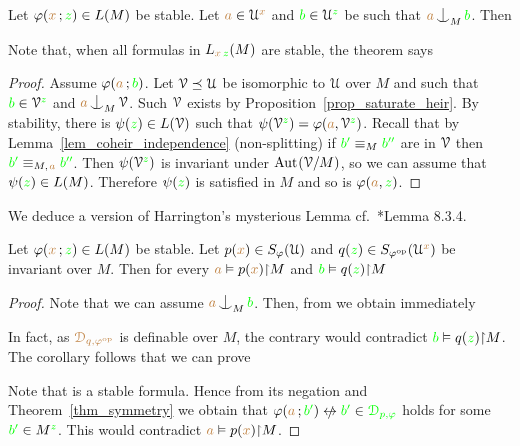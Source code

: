 \begin{theorem}[ (Symmetry)]\label{thm_symmetry}
  Let $\varphi({\color{brown} x}\,;{\color{green} z})\in L(M)$ be stable.
  Let ${\color{brown} a}\in\EuScript U^{\color{brown} x}$ and ${\color{green} b}\in\EuScript U^{\color{green} z}$ be such that ${\mr a}\nonfork_M{\gr b}$.
  Then\smallskip

\end{theorem}

Note that, when all formulas in $L_{{\color{brown} x}\,{\color{green} z}}(M)$ are stable, the theorem says


\vspace*{-\parskip}
\begin{proof}
  Assume $\varphi({\color{brown} a}\,;{\color{green} b})$.
  Let $\EuScript V\preceq\EuScript U$ be isomorphic to $\EuScript U$ over $M$ and such that ${\color{green} b}\in\EuScript V^{\color{green} z}$ and ${\mr a}\nonfork_M\V$. Such $\EuScript V$ exists by Proposition~\ref{prop_saturate_heir}.
  By stability, there is $\psi({\color{green} z})\in L(\EuScript V)$ such that $\psi(\EuScript V^{\color{green} z})=\varphi({\color{brown} a},\EuScript V^{\color{green} z})$.
  Recall that by Lemma~\ref{lem_coheir_independence} (non-splitting) if ${\color{green} b'}\equiv_M{\color{green} b''}$ are in $\EuScript V$ then ${\color{green} b'}\equiv_{M,\kern.2ex{\color{brown} a}}{\color{green} b''}$.
  Then $\psi(\EuScript V^{\color{green} z})$ is invariant under ${\rm Aut\kern.15ex}(\EuScript V/M)$, so we can assume that $\psi({\color{green} z})\in L(M)$.
  Therefore $\psi({\color{green} z})$ is satisfied in $M$ and so is $\varphi({\color{brown} a},{\color{green} z})$.
\end{proof}

We deduce a version of Harrington's mysterious Lemma cf.~\cite{TZ}*{Lemma 8.3.4}.

\begin{corollary}\label{corol_harrington1}
  Let $\varphi({\color{brown} x}\,;{\color{green} z})\in L(M)$ be stable.
  Let $p({\color{brown} x})\in S_\varphi(\EuScript U)$ and $q({\color{green} z})\in S_{\varphi^{\rm op}}(\EuScript U^{\color{brown} x})$ be invariant over $M$.
  Then for every ${\color{brown} a}\vDash p({\color{brown} x}){\restriction}M$ and ${\color{green} b}\vDash q({\color{green} z}){\restriction}M$\smallskip
  
\end{corollary}

\begin{proof}
  Note that we can assume ${\mr a}\nonfork_M{\gr b}$.
  Then, from we obtain immediately


  In fact, as ${\color{brown}\EuScript D_{q,\varphi^{\rm op}}}$ is definable over $M$, the contrary would contradict ${\color{green} b}\vDash q({\color{green} z}){\restriction}M$.
  The corollary follows that we can prove 


  Note that  is a stable formula. 
  Hence from its negation and Theorem~\ref{thm_symmetry} we obtain that $\phi({\mr a}\,;{\gr b'})\niff{\gr b'}\in{\gr\D_{p,\phi}}$ holds for some ${\color{green} b'}\in M^{\color{green} z}$.
  This would contradict ${\color{brown} a}\vDash p({\color{brown} x}){\restriction}M$.
\end{proof}

